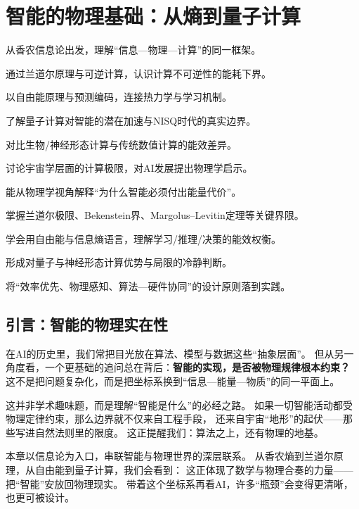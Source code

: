 \chapter{智能的物理基础：从熵到量子计算}

\begin{introduction}[本章提要]
  \item 从香农信息论出发，理解“信息—物理—计算”的同一框架。
  \item 通过兰道尔原理与可逆计算，认识计算不可逆性的能耗下界。
  \item 以自由能原理与预测编码，连接热力学与学习机制。
  \item 了解量子计算对智能的潜在加速与NISQ时代的真实边界。
  \item 对比生物/神经形态计算与传统数值计算的能效差异。
  \item 讨论宇宙学层面的计算极限，对AI发展提出物理学启示。
\end{introduction}

\begin{introduction}[你将收获]
  \item 能从物理学视角解释“为什么智能必须付出能量代价”。
  \item 掌握兰道尔极限、Bekenstein界、Margolus--Levitin定理等关键界限。
  \item 学会用自由能与信息熵语言，理解学习/推理/决策的能效权衡。
  \item 形成对量子与神经形态计算优势与局限的冷静判断。
  \item 将“效率优先、物理感知、算法—硬件协同”的设计原则落到实践。
\end{introduction}

\section{引言：智能的物理实在性}

在AI的历史里，我们常把目光放在算法、模型与数据这些“抽象层面”。  
但从另一角度看，一个更基础的追问总在背后：\textbf{智能的实现，是否被物理规律根本约束？}  
这不是把问题复杂化，而是把坐标系换到“信息—能量—物质”的同一平面上。

这并非学术趣味题，而是理解“智能是什么”的必经之路。  
如果一切智能活动都受物理定律约束，那么边界就不仅来自工程手段，  
还来自宇宙“地形”的起伏——\;那些写进自然法则里的限度。  
这正提醒我们：算法之上，还有物理的地基。

本章以信息论为入口，串联智能与物理世界的深层联系。  
从香农熵到兰道尔原理，从自由能到量子计算，我们会看到：  
这正体现了数学与物理合奏的力量——把“智能”安放回物理现实。  
带着这个坐标系再看AI，许多“瓶颈”会变得更清晰，也更可被设计。

